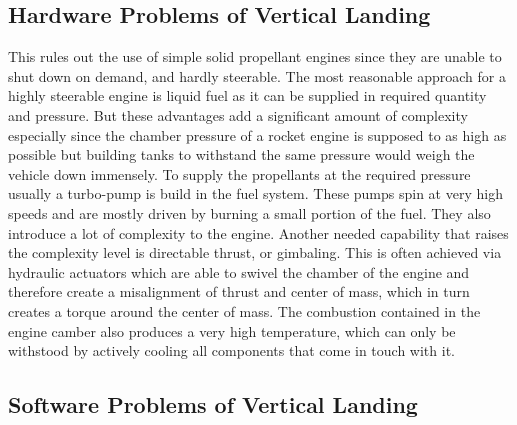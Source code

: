 \subsection{Hardware Problems of Vertical Landing}

This rules out the use of simple solid propellant engines since they are unable to shut down on demand, and hardly steerable. The most reasonable approach for a highly steerable engine is liquid fuel as it can be supplied in required quantity and pressure. But these advantages add a significant amount of complexity especially since the chamber pressure of a rocket engine is supposed to as high as possible but building tanks to withstand the same pressure would weigh the vehicle down immensely. To supply the propellants at the required pressure usually a turbo-pump is build in the fuel system. These pumps spin at very high speeds and are mostly driven by burning a small portion of the fuel. They also introduce a lot of complexity to the engine. Another needed capability that raises the complexity level is directable thrust, or gimbaling. This is often achieved via hydraulic actuators which are able to swivel the chamber of the engine and therefore create a misalignment of thrust and center of mass, which in turn creates a torque around the center of mass. The combustion contained in the engine camber also produces a very high temperature, which can only be withstood by actively cooling all components that come in touch with it.


\subsection{Software Problems of Vertical Landing}

